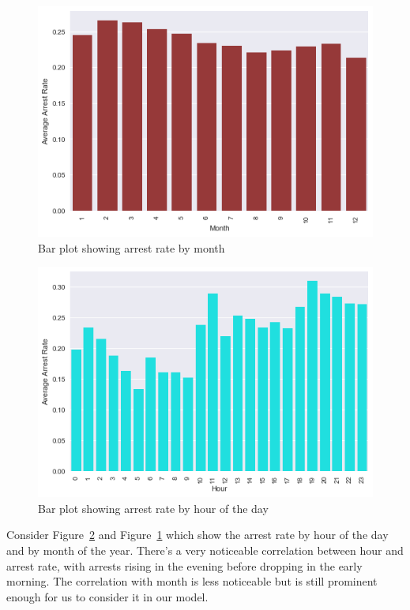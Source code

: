 \documentclass[10pt]{SelfArx} %
\begin{document}
    \begin{figure}[h]
      \includegraphics[width=\linewidth]{FinalVisualizations/month.png}
      \caption{Bar plot showing arrest rate by month}
      \label{fig:month}
    \end{figure}

    \begin{figure}[h]
      \includegraphics[width=\linewidth]{FinalVisualizations/hour.png}
      \caption{Bar plot showing arrest rate by hour of the day}
      \label{fig:hour}
    \end{figure}

    Consider Figure~\ref{fig:hour} and Figure~\ref{fig:month} which show the arrest
    rate by hour of the day and by month of the year. There's a very noticeable correlation between hour and arrest rate, with arrests rising in the evening before dropping in the early morning. The correlation with month is less noticeable but is still prominent enough for us to consider it in our model.
\end{document}
